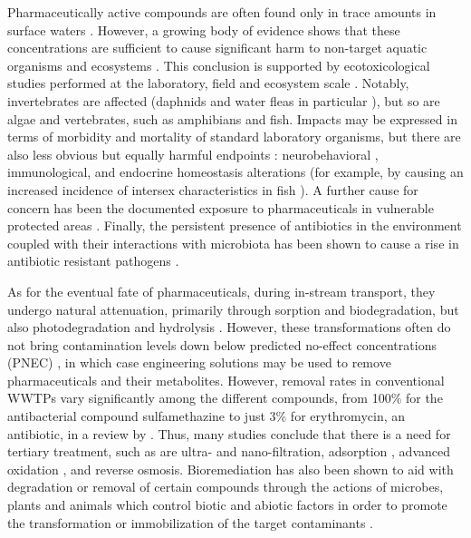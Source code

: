 \documentclass{article}
\begin{document}
Pharmaceutically active compounds are often found only in trace amounts in surface waters \citep{Quesada2019SurfaceReview}. However, a growing body of evidence shows that these concentrations are sufficient to cause significant harm to non-target aquatic organisms and ecosystems \citep{Brodin2014EcologicalAlterations,Miller2018AFauna,Shaliutina-Kolesova2020TheReview}. This conclusion is supported by ecotoxicological studies performed at the laboratory, field and ecosystem scale \citep{ausderBeek2016PharmaceuticalsPerspectives}. Notably, invertebrates are affected (daphnids and water fleas in particular \citep{Pal2010ImpactsEffects}), but so are algae and vertebrates, such as amphibians and fish. Impacts may be expressed in terms of morbidity and mortality \citep{Kummerer2009TheChallenges} of standard laboratory organisms, but there are also less obvious but equally harmful endpoints \citep{Daughton2001PharmaceuticalsOverview}: neurobehavioral \citep{Brodin2014EcologicalAlterations,Shaliutina-Kolesova2020TheReview}, immunological, and endocrine homeostasis alterations (for example, by causing an increased incidence of intersex characteristics in fish \citep{Dong2015FateStream}). A further cause for concern has been the documented exposure to pharmaceuticals in vulnerable protected areas \citep{Bradley2020ExposureRegion}. Finally, the persistent presence of antibiotics in the environment coupled with their interactions with microbiota has been shown to cause a rise in antibiotic resistant pathogens \citep{Leonard2018ExposureSurvey,Segura2009ReviewWaters}.

As for the eventual fate of pharmaceuticals, during in-stream transport, they undergo natural attenuation, primarily through sorption and biodegradation, but also photodegradation and hydrolysis \citep{Dong2015FateStream}. However, these transformations often do not bring contamination levels down below predicted no-effect concentrations (PNEC) \citep{Li2014OccurrenceSoil}, in which case engineering solutions may be used to remove pharmaceuticals and their metabolites. However, removal rates in conventional WWTPs vary significantly among the different compounds, from 100\% for the antibacterial compound sulfamethazine to just 3\% for erythromycin, an antibiotic, in a review by \citet{Verlicchi2012OccurrenceReview}. Thus, many studies conclude that there is a need for tertiary treatment, such as are ultra- and nano-filtration, adsorption \citep{Quesada2019SurfaceReview}, advanced oxidation \citep{Feng2018Metal-mediatedAssessment}, and reverse osmosis. Bioremediation has also been shown to aid with degradation or removal of certain compounds through the actions of microbes, plants \citep{Li2020PhytoremediationCycle} and animals which control biotic and abiotic factors in order to promote the transformation or immobilization of the target contaminants \citep{Gavrilescu2015EmergingBioremediation,Patel2020EmergingReview}.
    
\end{document}
